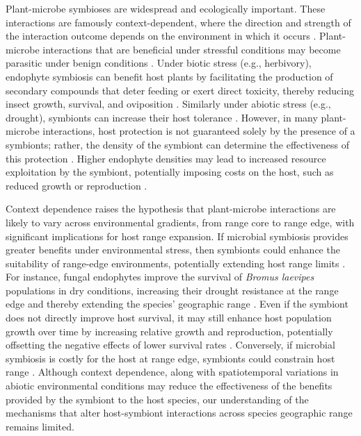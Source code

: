 \documentclass[11pt]{article}
\begin{document}
Plant-microbe symbioses are widespread and ecologically important. 
These interactions are famously context-dependent, where the direction and strength of the interaction outcome depends on the environment in which it occurs \citep{fowler2023geographic,hoeksema2015context, bronstein1994conditional}.
Plant-microbe  interactions that are beneficial under stressful conditions  may become parasitic under benign conditions \citep{giauque2019endophyte}.
Under biotic stress (e.g., herbivory), endophyte symbiosis can benefit host plants by facilitating the production of secondary compounds that deter feeding or exert direct toxicity, thereby reducing insect growth, survival, and oviposition \citep{atala2022fungal,bastias2017epichloe,vega2008insect}.
Similarly under abiotic stress (e.g., drought), symbionts can increase their host tolerance  \citep{clay2002evolutionary}.
However, in many plant-microbe interactions, host protection is not guaranteed solely by the presence of a symbionts; rather, the density of the symbiont can determine the effectiveness of this protection \citep{laughton2014combined}. 
Higher endophyte densities may lead to increased resource exploitation by the symbiont, potentially imposing costs on the host, such as reduced growth or reproduction \citep{faeth2009asexual}.

Context dependence raises the hypothesis that plant-microbe interactions are likely to vary across environmental gradients, from range core to range edge, with significant implications for host range expansion. If microbial symbiosis provides greater benefits under environmental stress, then symbionts could enhance the suitability of range-edge environments, potentially extending host range limits \citep{allsup2023shifting,rudgers2020climate}.
For instance, fungal endophytes improve the survival of \emph{Bromus laevipes}  populations in dry conditions, increasing their drought resistance at the range edge and thereby extending the species' geographic range \citep{david2019soil,afkhami2014mutualist}.
Even if the symbiont does not directly improve host survival, it may still enhance host population growth over time by increasing relative growth and reproduction, potentially offsetting the negative effects of lower survival rates \citep{yule2013costs}.
Conversely, if microbial symbiosis is costly for the host at range edge, symbionts could constrain host range \citep{benning2021microbes,benning2021plant,bennett2022costs}.
Although context dependence, along with spatiotemporal variations in abiotic environmental conditions may reduce the effectiveness of the benefits provided by the symbiont to the host species, our understanding of the mechanisms that alter host-symbiont interactions across species geographic range remains limited.
\end{document}
